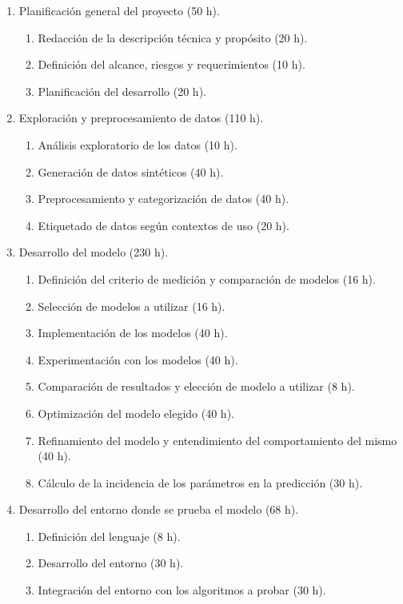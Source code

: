 \documentclass[
11pt, %
]{charter}
\begin{document}
\begin{enumerate}
\item Planificación general del proyecto (50 h).
	\begin{enumerate}
	\item Redacción de la descripción técnica y propósito (20 h).
	\item Definición del alcance, riesgos y requerimientos (10 h).
	\item Planificación del desarrollo (20 h).
	\end{enumerate}
\item Exploración y preprocesamiento de datos (110 h).
	\begin{enumerate}
	\item Análisis exploratorio de los datos (10 h).
	\item Generación de datos sintéticos (40 h).
	\item Preprocesamiento y categorización de datos (40 h).
	\item Etiquetado de datos según contextos de uso (20 h).
	\end{enumerate}
\item Desarrollo del modelo (230 h).
	\begin{enumerate}
	\item Definición del criterio de medición y comparación de modelos (16 h).
	\item Selección de modelos a utilizar (16 h).
	\item Implementación de los modelos (40 h).
	\item Experimentación con los modelos (40 h).
	\item Comparación de resultados y elección de modelo a utilizar (8 h).	
	\item Optimización del modelo elegido (40 h).
	\item Refinamiento del modelo y entendimiento del comportamiento del mismo (40 h).
	\item Cálculo de la incidencia de los parámetros en la predicción (30 h).
	\end{enumerate}
\item Desarrollo del entorno donde se prueba el modelo (68 h).
\begin{enumerate}
	\item Definición del lenguaje (8 h).
	\item Desarrollo del entorno (30 h).
	\item Integración del entorno con los algoritmos a probar (30 h).
\end{enumerate}

\end{enumerate}
\end{document}
